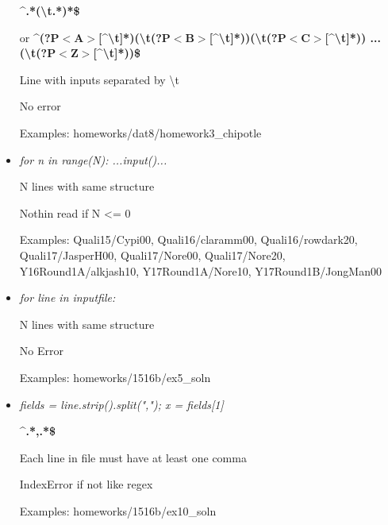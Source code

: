 \documentclass[11pt]{article}
\begin{document}
\begin{itemize}
\textbf{\textasciicircum.*(\textbackslash{}t.*)*\$} 

or \textbf{\textasciicircum(?P$<$A$>$[\textasciicircum\textbackslash{}t]*)(\textbackslash{}t(?P$<$B$>$[\textasciicircum\textbackslash{}t]*))(\textbackslash{}t(?P$<$C$>$[\textasciicircum\textbackslash{}t]*)) ... (\textbackslash{}t(?P$<$Z$>$[\textasciicircum\textbackslash{}t]*))\$}

Line with inputs separated by \textbackslash{}t

No error

Examples: homeworks/dat8/homework3\_chipotle

\item \textit{for n in range(N): ...input()...}

N lines with same structure

Nothin read if N <= 0

Examples: Quali15/Cypi00, Quali16/claramm00, Quali16/rowdark20, Quali17/JasperH00, Quali17/Nore00, Quali17/Nore20, Y16Round1A/alkjash10, Y17Round1A/Nore10, Y17Round1B/JongMan00

\item \textit{for line in inputfile:}

N lines with same structure

No Error

Examples: homeworks/1516b/ex5\_soln

\item \textit{fields = line.strip().split(","); x = fields[1]}

\textbf{\textasciicircum.*,.*\$} 

Each line in file must have at least one comma

IndexError if not like regex

Examples: homeworks/1516b/ex10\_soln

\end{itemize}
\end{document}
